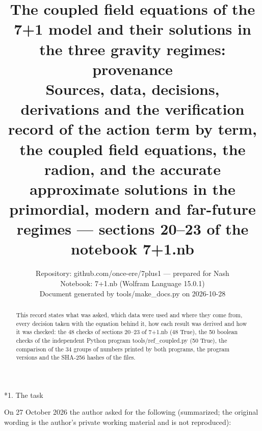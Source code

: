 \documentclass[10pt,a4paper]{article}
\makeatletter
\renewcommand\section{\@startsection{section}{1}{\z@}{-3.5ex \@plus -1ex \@minus -.2ex}{2.3ex \@plus.2ex}{\normalfont\Large\bfseries\raggedright}}
\makeatother
\begin{document}
\title{The coupled field equations of the 7+1 model and their solutions in the three gravity regimes: provenance\\[0.4em]\large Sources, data, decisions, derivations and the verification record of the action term by term, the coupled field equations, the radion, and the accurate approximate solutions in the primordial, modern and far-future regimes — sections 20–23 of the notebook 7+1.nb}
\author{Repository: github.com/once-ere/7plus1 — prepared for Nash\\ Notebook: 7+1.nb (Wolfram Language 15.0.1)\\ Document generated by tools/make\_docs.py on 2026-10-28}
\date{}
\maketitle
\begin{abstract}
This record states what was asked, which data were used and where they come from, every decision taken with the equation behind it, how each result was derived and how it was checked: the 48 checks of sections 20–23 of 7+1.nb (48 True), the 50 boolean checks of the independent Python program tools/ref\_coupled.py (50 True), the comparison of the 34 groups of numbers printed by both programs, the program versions and the SHA-256 hashes of the files.
\end{abstract}
\tableofcontents
{}\section*{1. The task}
On 27 October 2026 the author asked for the following (summarized; the original wording is the author’s private working material and is not reproduced):
\end{document}
